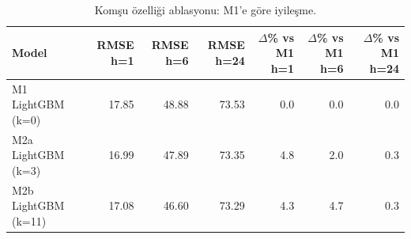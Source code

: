 \begin{table}[t]
\caption{Komşu özelliği ablasyonu: M1'e göre iyileşme.}
\label{tab:rq1_ablation}
\centering\footnotesize
\begin{tabular}{lrrrrrr}
\toprule
Model & RMSE h=1 & RMSE h=6 & RMSE h=24 & $\Delta$\% vs M1 h=1 & $\Delta$\% vs M1 h=6 & $\Delta$\% vs M1 h=24 \\
\midrule
M1 LightGBM (k=0) & 17.85 & 48.88 & 73.53 & 0.0 & 0.0 & 0.0 \\
M2a LightGBM (k=3) & 16.99 & 47.89 & 73.35 & 4.8 & 2.0 & 0.3 \\
M2b LightGBM (k=11) & 17.08 & 46.60 & 73.29 & 4.3 & 4.7 & 0.3 \\
\bottomrule
\end{tabular}
\end{table}

